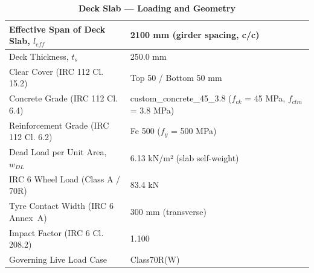 \documentclass[12pt,a4paper]{report}
\numberwithin{table}{chapter}
\numberwithin{figure}{chapter}
\begin{document}
\vspace{1em}
\begin{longtable}{|L{5.5cm}|p{10.0cm}|}
\caption{\textbf{Deck Slab --- Loading and Geometry}}
\hline
\textnormal{Effective Span of Deck Slab, $l_{eff}$} & 2100 mm (girder spacing, c/c) \\[6pt]
\hline
\textnormal{Deck Thickness, $t_s$} & 250.0 mm \\[6pt]
\hline
\textnormal{Clear Cover (IRC 112 Cl. 15.2)} & Top 50 / Bottom 50 mm \\[6pt]
\hline
\textnormal{Concrete Grade (IRC 112 Cl. 6.4)} & custom\_\allowbreak{}concrete\_\allowbreak{}45\_\allowbreak{}3.8 ($f_{ck}$ = 45 MPa, $f_{ctm}$ = 3.8 MPa) \\[6pt]
\hline
\textnormal{Reinforcement Grade (IRC 112 Cl. 6.2)} & Fe 500 ($f_y$ = 500 MPa) \\[6pt]
\hline
\textnormal{Dead Load per Unit Area, $w_{DL}$} & 6.13 kN/m² (slab self-weight) \\[6pt]
\hline
\textnormal{IRC 6 Wheel Load (Class A / 70R)} & 83.4 kN \\[6pt]
\hline
\textnormal{Tyre Contact Width (IRC 6 Annex~A)} & 300 mm (transverse) \\[6pt]
\hline
\textnormal{Impact Factor (IRC 6 Cl. 208.2)} & 1.100 \\[6pt]
\hline
\textnormal{Governing Live Load Case} & Class70R(W) \\[6pt]
\hline
\end{longtable}
\end{document}
